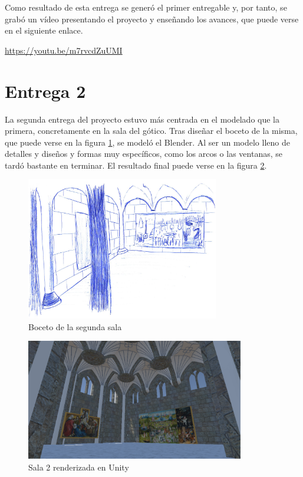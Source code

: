 Como resultado de esta entrega se generó el primer entregable y, por tanto, se grabó un vídeo presentando el proyecto y enseñando los avances, que puede verse en el siguiente enlace.

\begin{center}
    \url{https://youtu.be/m7rvcdZuUMI}
\end{center}


\section{Entrega 2}

La segunda entrega del proyecto estuvo más centrada en el modelado que la primera, concretamente en la sala del gótico. Tras diseñar el boceto de la misma, que puede verse en la figura \ref{fig:bocetos-sala-2}, se modeló el Blender. Al ser un modelo lleno de detalles y diseños y formas muy específicos, como los arcos o las ventanas, se tardó bastante en terminar. El resultado final puede verse en la figura \ref{fig:unity-sala-2}.

\begin{figure}[!h]
\begin{center}
\includegraphics[width=0.75\textwidth]{imagenes/7/bocetos/boceto-sala-2.png}
\caption{Boceto de la segunda sala}
\label{fig:bocetos-sala-2}
\end{center}
\end{figure}

\begin{figure}[!h]
\begin{center}
\includegraphics[width=0.85\textwidth]{imagenes/7/salas-unity/unity-sala-2.png}
\caption{Sala 2 renderizada en Unity}
\label{fig:unity-sala-2}
\end{center}
\end{figure}

